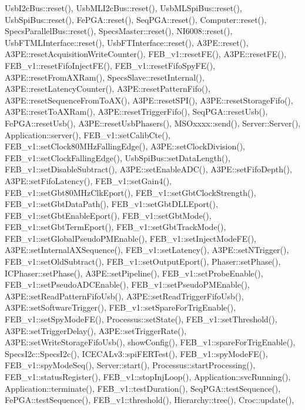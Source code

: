 Usb\+I2c\+Bus\+::reset(), Usb\+M\+L\+I2c\+Bus\+::reset(), Usb\+M\+L\+Spi\+Bus\+::reset(), Usb\+Spi\+Bus\+::reset(), Fe\+P\+G\+A\+::reset(), Seq\+P\+G\+A\+::reset(), Computer\+::reset(), Specs\+Parallel\+Bus\+::reset(), Specs\+Master\+::reset(), N\+I6008\+::reset(), Usb\+F\+T\+M\+L\+Interface\+::reset(), Usb\+F\+T\+Interface\+::reset(), A3\+P\+E\+::reset(), A3\+P\+E\+::reset\+Acquisition\+Write\+Counter(), F\+E\+B\+\_\+v1\+::reset\+F\+E(), A3\+P\+E\+::reset\+F\+E(), F\+E\+B\+\_\+v1\+::reset\+Fifo\+Inject\+F\+E(), F\+E\+B\+\_\+v1\+::reset\+Fifo\+Spy\+F\+E(), A3\+P\+E\+::reset\+From\+A\+X\+Ram(), Specs\+Slave\+::reset\+Internal(), A3\+P\+E\+::reset\+Latency\+Counter(), A3\+P\+E\+::reset\+Pattern\+Fifo(), A3\+P\+E\+::reset\+Sequence\+From\+To\+A\+X(), A3\+P\+E\+::reset\+S\+P\+I(), A3\+P\+E\+::reset\+Storage\+Fifo(), A3\+P\+E\+::reset\+To\+A\+X\+Ram(), A3\+P\+E\+::reset\+Trigger\+Fifo(), Seq\+P\+G\+A\+::reset\+Usb(), Fe\+P\+G\+A\+::reset\+Usb(), A3\+P\+E\+::reset\+Usb\+Phasers(), M\+S\+Oxxxx\+::send(), Server\+::\+Server(), Application\+::server(), F\+E\+B\+\_\+v1\+::set\+Calib\+Cte(), F\+E\+B\+\_\+v1\+::set\+Clock80\+M\+Hz\+Falling\+Edge(), A3\+P\+E\+::set\+Clock\+Division(), F\+E\+B\+\_\+v1\+::set\+Clock\+Falling\+Edge(), Usb\+Spi\+Bus\+::set\+Data\+Length(), F\+E\+B\+\_\+v1\+::set\+Disable\+Subtract(), A3\+P\+E\+::set\+Enable\+A\+D\+C(), A3\+P\+E\+::set\+Fifo\+Depth(), A3\+P\+E\+::set\+Fifo\+Latency(), F\+E\+B\+\_\+v1\+::set\+Gain4(), F\+E\+B\+\_\+v1\+::set\+Gbt80\+M\+Hz\+Clk\+Eport(), F\+E\+B\+\_\+v1\+::set\+Gbt\+Clock\+Strength(), F\+E\+B\+\_\+v1\+::set\+Gbt\+Data\+Path(), F\+E\+B\+\_\+v1\+::set\+Gbt\+D\+L\+L\+Eport(), F\+E\+B\+\_\+v1\+::set\+Gbt\+Enable\+Eport(), F\+E\+B\+\_\+v1\+::set\+Gbt\+Mode(), F\+E\+B\+\_\+v1\+::set\+Gbt\+Term\+Eport(), F\+E\+B\+\_\+v1\+::set\+Gbt\+Track\+Mode(), F\+E\+B\+\_\+v1\+::set\+Global\+Pseudo\+P\+M\+Enable(), F\+E\+B\+\_\+v1\+::set\+Inject\+Mode\+F\+E(), A3\+P\+E\+::set\+Internal\+A\+X\+Sequence(), F\+E\+B\+\_\+v1\+::set\+Latency(), A3\+P\+E\+::set\+N\+Trigger(), F\+E\+B\+\_\+v1\+::set\+Old\+Subtract(), F\+E\+B\+\_\+v1\+::set\+Output\+Eport(), Phaser\+::set\+Phase(), I\+C\+Phaser\+::set\+Phase(), A3\+P\+E\+::set\+Pipeline(), F\+E\+B\+\_\+v1\+::set\+Probe\+Enable(), F\+E\+B\+\_\+v1\+::set\+Pseudo\+A\+D\+C\+Enable(), F\+E\+B\+\_\+v1\+::set\+Pseudo\+P\+M\+Enable(), A3\+P\+E\+::set\+Read\+Pattern\+Fifo\+Usb(), A3\+P\+E\+::set\+Read\+Trigger\+Fifo\+Usb(), A3\+P\+E\+::set\+Software\+Trigger(), F\+E\+B\+\_\+v1\+::set\+Spare\+For\+Trig\+Enable(), F\+E\+B\+\_\+v1\+::set\+Spy\+Mode\+F\+E(), Processus\+::set\+State(), F\+E\+B\+\_\+v1\+::set\+Threshold(), A3\+P\+E\+::set\+Trigger\+Delay(), A3\+P\+E\+::set\+Trigger\+Rate(), A3\+P\+E\+::set\+Write\+Storage\+Fifo\+Usb(), show\+Config(), F\+E\+B\+\_\+v1\+::spare\+For\+Trig\+Enable(), Specs\+I2c\+::\+Specs\+I2c(), I\+C\+E\+C\+A\+Lv3\+::spi\+F\+E\+R\+Test(), F\+E\+B\+\_\+v1\+::spy\+Mode\+F\+E(), F\+E\+B\+\_\+v1\+::spy\+Mode\+Seq(), Server\+::start(), Processus\+::start\+Processing(), F\+E\+B\+\_\+v1\+::status\+Register(), F\+E\+B\+\_\+v1\+::stop\+Inj\+Loop(), Application\+::svc\+Running(), Application\+::terminate(), F\+E\+B\+\_\+v1\+::test\+Duration(), Seq\+P\+G\+A\+::test\+Sequence(), Fe\+P\+G\+A\+::test\+Sequence(), F\+E\+B\+\_\+v1\+::threshold(), Hierarchy\+::tree(), Croc\+::update(), 